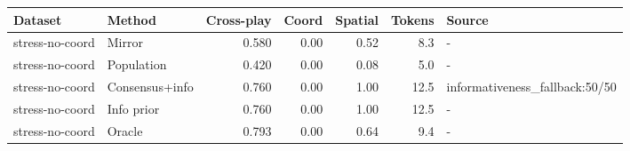 \begin{tabular}{llrrrrl}
\toprule
Dataset & Method & Cross-play & Coord & Spatial & Tokens & Source \\
\midrule
stress-no-coord & Mirror & 0.580 & 0.00 & 0.52 & 8.3 & - \\
stress-no-coord & Population & 0.420 & 0.00 & 0.08 & 5.0 & - \\
stress-no-coord & Consensus+info & 0.760 & 0.00 & 1.00 & 12.5 & informativeness\_fallback:50/50 \\
stress-no-coord & Info prior & 0.760 & 0.00 & 1.00 & 12.5 & - \\
stress-no-coord & Oracle & 0.793 & 0.00 & 0.64 & 9.4 & - \\
\bottomrule
\end{tabular}
